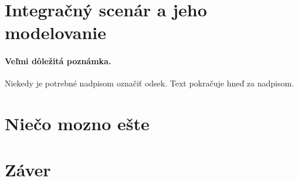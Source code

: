 \documentclass[10pt,twoside,slovak,a4paper]{article}
\begin{document}
\section{Integračný scenár a jeho modelovanie} \label{Integračný}

\paragraph{Veľmi dôležitá poznámka.}
Niekedy je potrebné nadpisom označiť odsek. Text pokračuje hneď za nadpisom.



\section{Niečo mozno ešte} \label{Niečo}





\section{Záver} \label{zaver} %






\end{document}
